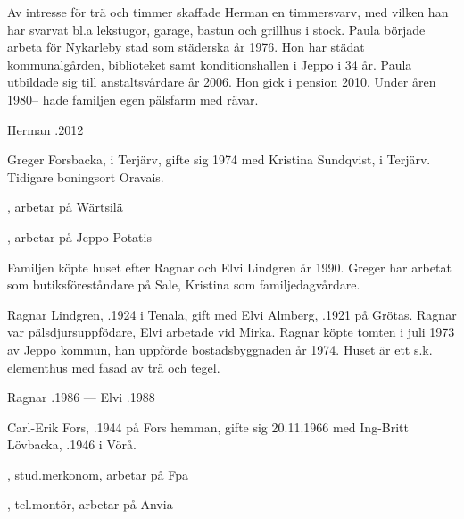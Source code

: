 Av intresse för trä och timmer skaffade Herman en timmersvarv, med vilken han har svarvat bl.a lekstugor, garage, bastun och grillhus i stock. Paula började arbeta för Nykarleby stad som städerska år 1976. Hon har städat kommunalgården, biblioteket samt konditionshallen i Jeppo i 34 år. Paula utbildade sig till anstaltsvårdare år 2006. Hon gick i pension 2010. Under åren 1980-- hade familjen egen pälsfarm med rävar.

Herman .2012






Greger Forsbacka,  i Terjärv, gifte sig 1974 med Kristina Sundqvist,  i Terjärv. Tidigare boningsort Oravais.
\begin{jhchildren}
  \item {}, arbetar på Wärtsilä
  \item {}, arbetar på Jeppo Potatis
\end{jhchildren}

Familjen köpte huset efter Ragnar och Elvi Lindgren år 1990. Greger har arbetat som butiksföreståndare på Sale, Kristina som familjedagvårdare.


Ragnar Lindgren, .1924 i Tenala, gift med Elvi Almberg, .1921 på Grötas. Ragnar var pälsdjursuppfödare, Elvi arbetade vid Mirka. Ragnar köpte tomten i juli 1973 av Jeppo kommun, han uppförde bostadsbyggnaden år 1974. Huset är ett s.k. elementhus med fasad av trä och tegel.

Ragnar .1986  ---  Elvi .1988






Carl-Erik Fors, .1944 på Fors hemman, gifte sig 20.11.1966 med Ing-Britt Lövbacka, .1946 i Vörå.
\begin{jhchildren}
  \item {}, stud.merkonom, arbetar på Fpa
  \item {}, tel.montör, arbetar på Anvia
\end{jhchildren}

